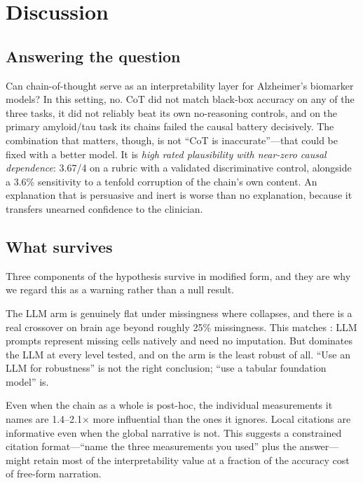 \section{Discussion}
\label{sec:discussion}

\subsection{Answering the question}

Can chain-of-thought serve as an interpretability layer for Alzheimer's biomarker models? In this
setting, no. CoT did not match black-box accuracy on any of the three tasks, it did not reliably
beat its own no-reasoning controls, and on the primary amyloid/tau task its chains failed the causal
battery decisively. The combination that matters, though, is not ``CoT is inaccurate''---that could
be fixed with a better model. It is \emph{high rated plausibility with near-zero causal
dependence}: 3.67/4 on a rubric with a validated discriminative control, alongside a 3.6\%
sensitivity to a tenfold corruption of the chain's own content. An explanation that is persuasive
and inert is worse than no explanation, because it transfers unearned confidence to the clinician.

\subsection{What survives}

Three components of the hypothesis survive in modified form, and they are why we regard this as a
warning rather than a null result.

 The LLM
arm is genuinely flat under missingness where \xgb collapses, and there is a real crossover on
brain age beyond roughly 25\% missingness. This matches \citet{kearney2026tapgpt}: LLM prompts
represent missing cells natively and need no imputation. But \tabpfn dominates the LLM at every
level tested, and on \taskthree the \cotarm arm is the least robust of all. ``Use an LLM for
robustness'' is not the right conclusion; ``use a tabular foundation model'' is.

 Even when the chain as a whole is post-hoc,
the individual measurements it names are 1.4--2.1$\times$ more influential than the ones it ignores.
Local citations are informative even when the global narrative is not. This suggests a constrained
citation format---``name the three measurements you used'' plus the answer---might retain most of
the interpretability value at a fraction of the accuracy cost of free-form narration.

